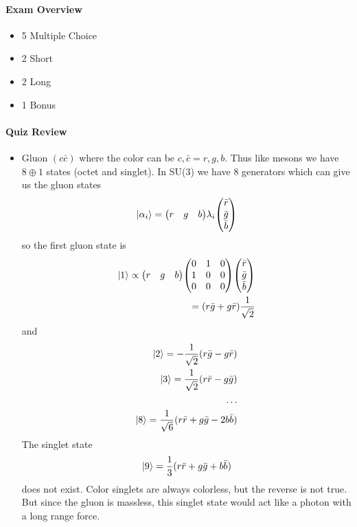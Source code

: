 \documentclass[../main.tex]{subfiles}
\begin{document}
\newpage
{}
\paragraph*{Exam Overview}
\begin{itemize}
    \item 5 Multiple Choice
    \item 2 Short
    \item 2 Long
    \item 1 Bonus
\end{itemize}
\paragraph*{Quiz Review}
\begin{itemize}
    \item Gluon $(c \bar c)$ where the color can be $c, \bar c = r, g ,b$. Thus like mesons 
    we have $8 \oplus 1$ states (octet and singlet). In SU(3) we have 8 generators which can give
    us the gluon states
    \begin{align*}
        \ket{\alpha_i} = \mqty(r & g & b) \lambda_i \mqty(\bar r \\ \bar g \\ \bar b)
    \end{align*}
    so the first gluon state is
    \begin{align*}
        \ket{1} \propto \mqty(r & g & b) \mqty(0 & 1 & 0 \\ 1 & 0 & 0 \\ 0 & 0 & 0) \mqty(\bar r \\ \bar g \\ \bar b) \\
        = (r \bar g + g \bar r) \frac{1}{\sqrt{2}}
    \end{align*}
    and
    \begin{align*}
        \ket{2} = -\frac{1}{\sqrt{2}} (r \bar g - g \bar r) \\
        \ket{3} = \frac{1}{\sqrt{2}} (r \bar r - g \bar g) \\
        \dots \\
        \ket{8} = \frac{1}{\sqrt{6}} (r \bar r + g \bar g - 2 b \bar b)
    \end{align*}
    The singlet state
    \begin{align*}
        \ket{9} = \frac{1}{3} (r \bar r + g \bar g + b \bar b)
    \end{align*}
    does not exist. Color singlets are always colorless, but the reverse is not true. But since the
    gluon is massless, this singlet state would act like a photon with a long range force. 
\end{itemize}
\end{document}
